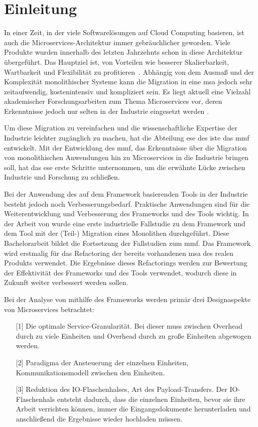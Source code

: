 \chapter{Einleitung}
\label{chap:einleitung}

In einer Zeit, in der viele Softwarelösungen auf Cloud Computing basieren, ist auch die Mi\-cro\-services-Architektur immer gebräuchlicher geworden.
Viele Produkte wurden innerhalb des letzten Jahrzehnts schon in diese Architektur übergeführt.
Das Hauptziel ist, von Vorteilen wie besserer Skalierbarkeit, Wartbarkeit und Flexibilität zu profitieren~\cite{Fritzsch_2019,taibi2017processmotivations}.
Abhängig von dem Ausmaß und der Komplexität monolithischer Systeme kann die Migration in eine \gls{msa} jedoch sehr zeitaufwendig, kostenintensiv und kompliziert sein.
Es liegt aktuell eine Vielzahl akademischer Forschungsarbeiten zum Thema Microservices vor, deren Erkenntnisse jedoch nur selten in der Industrie eingesetzt werden \cite{fritzsch2022architecturecentric}.

Um diese Migration zu vereinfachen und die wissenschaftliche Expertise der Industrie leichter zugänglich zu machen, hat die Abteilung \gls{ese} des \gls{iste} das \gls{mmf} entwickelt.
Mit der Entwicklung des \gls{mmf}, das Erkenntnisse über die Migration von monolithischen Anwendungen hin zu Microservices in die Industrie bringen soll, hat das \gls{ese} erste Schritte unternommen, um die erwähnte Lücke zwischen Industrie und Forschung zu schließen.

Bei der Anwendung des auf dem Framework basierenden Tools in der Industrie besteht jedoch noch Verbesserungsbedarf.
Praktische Anwendungen sind für die Weiterentwicklung und Verbesserung des Frameworks und des Tools wichtig.
In der Arbeit von  wurde eine erste industrielle Fallstudie zu dem Framework und dem Tool mit der (Teil-) Migration eines Monolithen durchgeführt.
Diese Bachelorarbeit bildet die Fortsetzung der Fallstudien zum \gls{mmf}.
Das Framework wird erstmalig für das Refactoring der bereits vorhandenen \gls{msa} des realen Produkts \jf verwendet.
Die Ergebnisse dieses Refactorings werden zur Bewertung der Effektivität des Frameworks und des Tools verwendet, wodurch diese in Zukunft weiter verbessert werden sollen.

Bei der Analyse von \jf mithilfe des Frameworks werden primär drei Designaspekte von Microservices betrachtet:
\begin{enumerate}
	\item[{[1]}] Die optimale Service-Granularität. Bei dieser muss zwischen Overhead durch zu viele Einheiten und Overhead durch zu große Einheiten abgewogen werden.
	\item[{[2]}] Paradigma der Ansteuerung der einzelnen Einheiten, Kommunikationsmodell zwischen den Einheiten.
	\item[{[3]}] Reduktion des IO-Flaschenhalses, Art des Payload-Transfers. %
	Der IO-Flaschenhals entsteht dadurch, dass die einzelnen Einheiten, bevor sie ihre Arbeit verrichten können, immer die Eingangsdokumente herunterladen und anschließend die Ergebnisse wieder hochladen müssen.
\end{enumerate}

